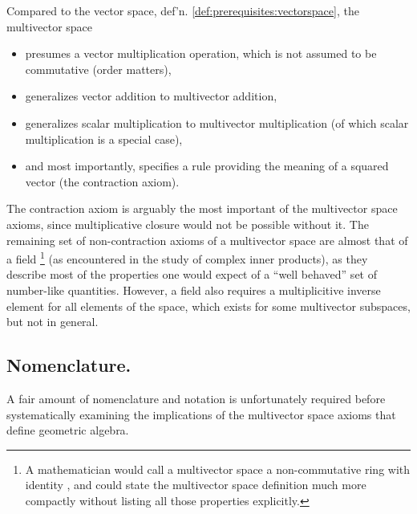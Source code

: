 Compared to the vector space, def'n. \ref{def:prerequisites:vectorspace}, the multivector space

\begin{itemize}
\item presumes a vector multiplication operation, which is not assumed to be commutative (order matters),
\item generalizes vector addition to multivector addition,
\item generalizes scalar multiplication to multivector multiplication (of which scalar multiplication is a special case),
\item and most importantly, specifies a rule providing the meaning of a squared vector (the contraction axiom).
\end{itemize}

The contraction axiom is arguably the most important of the multivector space axioms, since multiplicative closure would not be possible without it.
The remaining set of non-contraction axioms of a multivector space are almost that of a field
\footnote{A mathematician would call a multivector space a non-commutative ring with identity \citep{van1943modern}, and could state the multivector space definition much more compactly without listing all those properties explicitly.}
(as encountered in the study of complex inner products),
as they describe most of the properties one
would expect of a ``well behaved'' set of number-like quantities.
However, a field also requires a multiplicitive inverse element for all elements of the space, which exists for some multivector subspaces, but not in general.


\subsection{Nomenclature.}

A fair amount of nomenclature and notation is unfortunately required before systematically examining the implications of the multivector space axioms that define geometric algebra.


